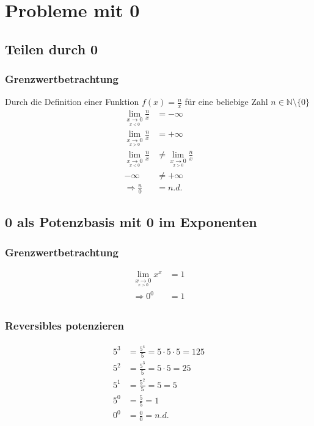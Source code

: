 \documentclass{article}
\newcommand{\N}{\mathbb{N}}
\begin{document}
\section{Probleme mit 0}
\subsection{Teilen durch 0}
\subsubsection{Grenzwertbetrachtung}
Durch die Definition einer Funktion $f(x) = \frac{n}{x}$ für eine beliebige Zahl $n \in \N \setminus \{0\}$
\begin{align*}
\lim\limits_{\underset{x < 0}{x \to 0}} \frac{n}{x} &= - \infty \\
\lim\limits_{\underset{x > 0}{x \to 0}} \frac{n}{x} &= + \infty \\
\lim\limits_{\underset{x < 0}{x \to 0}} \frac{n}{x} &\neq \lim\limits_{\underset{x > 0}{x \to 0}} \frac{n}{x}				\\
- \infty &\neq + \infty											\\
\Longrightarrow \frac{n}{0} &= n. d.
\end{align*}

\subsection{0 als Potenzbasis mit 0 im Exponenten}
\subsubsection{Grenzwertbetrachtung}

\begin{align*}
\lim\limits_{\underset{x > 0}{x \to 0}} x^x &= 1 \\
\Longrightarrow 0^0 &= 1 \\
\end{align*}

\subsubsection{Reversibles potenzieren}

\begin{align*}
5^3 &= \frac{5^4}{5} = 5 \cdot 5 \cdot 5 = 125 	\\
5^2 &= \frac{5^3}{5} = 5 \cdot 5 = 25 			\\
5^1 &= \frac{5^2}{5} = 5 = 5 					\\
5^0 &= \frac{5}{5} = 1 							\\
0^0 &= \frac{0}{0} = n.d.
\end{align*}
\end{document}
